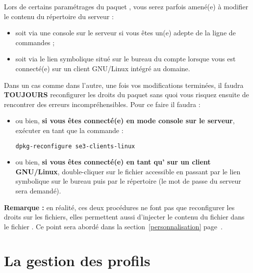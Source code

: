 \begin{alerte}
Lors de certains paramétrages du paquet , vous serez
parfois amené(e) à modifier le contenu du répertoire 
 du serveur :
%
\begin{itemize}
\item soit via une console sur le serveur si vous êtes un(e) adepte de la ligne de commandes ;
\item soit via le lien symbolique  situé sur le bureau du compte
 lorsque vous est connecté(e) sur un client GNU/Linux intégré au domaine.
\end{itemize}
%
Dans un cas comme dans l'autre, une fois vos modifications terminées, il faudra \textbf{TOUJOURS}
reconfigurer les droits du paquet  sans quoi vous
risquez ensuite de rencontrer des erreurs incompréhensibles. Pour ce faire il faudra :
%
\begin{itemize}
\item ou bien, \textbf{si vous êtes connecté(e) en mode console sur le serveur},
exécuter en tant que  la commande :
\begin{lstlisting}
dpkg-reconfigure se3-clients-linux
\end{lstlisting}
\item ou bien, \textbf{si vous êtes connecté(e) en tant qu' sur un
client GNU/Linux}, double-cliquer sur le fichier 
accessible en passant par le lien symbolique  sur
le bureau puis par le répertoire 
(le mot de passe  du serveur sera demandé).
\end{itemize}
%
\textbf{Remarque :} en réalité, ces deux procédures ne font pas que reconfigurer les droits
sur les fichiers, elles permettent aussi d'injecter le contenu du fichier
 dans le fichier . Ce point sera abordé
dans la section~\ref{personnalisation} page~\pageref{personnalisation}.
\end{alerte}









\section{La gestion des profils}
\label{profils}



